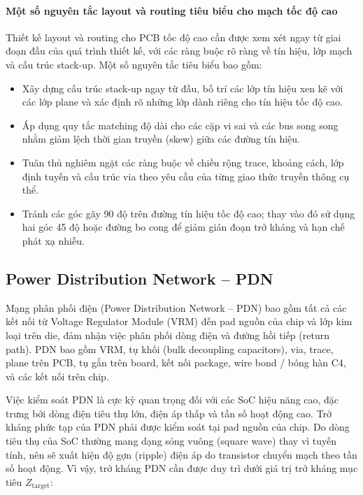                     \paragraph{Một số nguyên tắc layout và routing tiêu biểu cho mạch tốc độ cao}
                        Thiết kế layout và routing cho PCB tốc độ cao cần được xem xét ngay từ giai đoạn đầu của quá trình thiết kế, với các ràng buộc rõ ràng về tín hiệu, lớp mạch và cấu trúc stack-up. Một số nguyên tắc tiêu biểu bao gồm:
                        \begin{itemize}
                            \item Xây dựng cấu trúc stack-up ngay từ đầu, bố trí các lớp tín hiệu xen kẽ với các lớp plane và xác định rõ những lớp dành riêng cho tín hiệu tốc độ cao.
                            \item Áp dụng quy tắc matching độ dài cho các cặp vi sai và các bus song song nhằm giảm lệch thời gian truyền (skew) giữa các đường tín hiệu.
                            \item Tuân thủ nghiêm ngặt các ràng buộc về chiều rộng trace, khoảng cách, lớp định tuyến và cấu trúc via theo yêu cầu của từng giao thức truyền thông cụ thể.
                            \item Tránh các góc gãy 90 độ trên đường tín hiệu tốc độ cao; thay vào đó sử dụng hai góc 45 độ hoặc đường bo cong để giảm gián đoạn trở kháng và hạn chế phát xạ nhiễu.
                        \end{itemize}
                
            \subsection{Power Distribution Network – PDN}
                Mạng phân phối điện (Power Distribution Network – PDN) bao gồm tất cả các kết nối từ Voltage Regulator Module (VRM) đến pad nguồn của chip và lớp kim loại trên die, đảm nhận việc phân phối dòng điện và đường hồi tiếp (return path). PDN bao gồm VRM, tụ khối (bulk decoupling capacitors), via, trace, plane trên PCB, tụ gắn trên board, kết nối package, wire bond / bóng hàn C4, và các kết nối trên chip.
                
                Việc kiểm soát PDN là cực kỳ quan trọng đối với các SoC hiệu năng cao, đặc trưng bởi dòng điện tiêu thụ lớn, điện áp thấp và tần số hoạt động cao. Trở kháng phức tạp của PDN phải được kiểm soát tại pad nguồn của chip. Do dòng tiêu thụ của SoC thường mang dạng sóng vuông (square wave) thay vì tuyến tính, nên sẽ xuất hiện độ gợn (ripple) điện áp do transistor chuyển mạch theo tần số hoạt động. Vì vậy, trở kháng PDN cần được duy trì dưới giá trị trở kháng mục tiêu $Z_{\text{target}}$:
                

